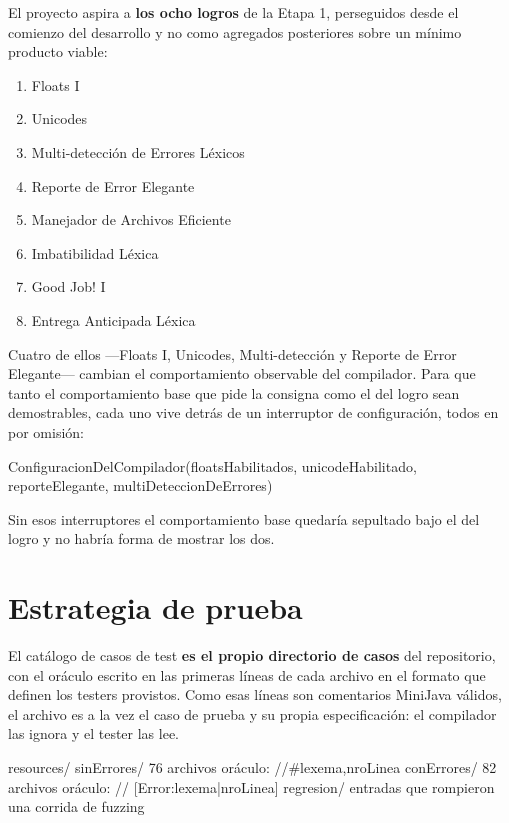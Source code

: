 \documentclass[11pt,a4paper]{article}
\begin{document}
El proyecto aspira a \textbf{los ocho logros} de la Etapa 1, perseguidos desde el comienzo del
desarrollo y no como agregados posteriores sobre un mínimo producto viable:

\begin{enumerate}[leftmargin=1.8em,itemsep=0.3ex]
\item Floats I
\item Unicodes
\item Multi-detección de Errores Léxicos
\item Reporte de Error Elegante
\item Manejador de Archivos Eficiente
\item Imbatibilidad Léxica
\item Good Job! I
\item Entrega Anticipada Léxica
\end{enumerate}

Cuatro de ellos ---Floats I, Unicodes, Multi-detección y Reporte de Error Elegante--- cambian el
comportamiento observable del compilador. Para que tanto el comportamiento base que pide la consigna
como el del logro sean demostrables, cada uno vive detrás de un interruptor de configuración, todos
en  por omisión:

\begin{codigoLlano}
ConfiguracionDelCompilador(floatsHabilitados, unicodeHabilitado,
                           reporteElegante, multiDeteccionDeErrores)
\end{codigoLlano}

Sin esos interruptores el comportamiento base quedaría sepultado bajo el del logro y no habría forma
de mostrar los dos.

\section{Estrategia de prueba}

El catálogo de casos de test \textbf{es el propio directorio de casos} del repositorio, con el
oráculo escrito en las primeras líneas de cada archivo en el formato que definen los testers
provistos. Como esas líneas son comentarios MiniJava válidos, el archivo es a la vez el caso de
prueba y su propia especificación: el compilador las ignora y el tester las lee.

\begin{codigoLlano}
resources/
    sinErrores/    76 archivos   oráculo: //#lexema,nroLinea
    conErrores/    82 archivos   oráculo: // [Error:lexema|nroLinea]
    regresion/                   entradas que rompieron una corrida de fuzzing
\end{codigoLlano}
\end{document}
